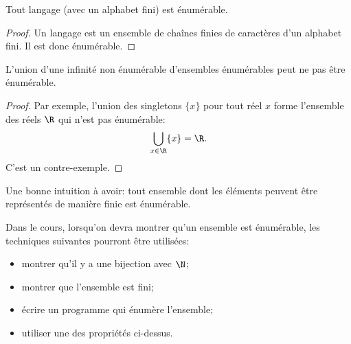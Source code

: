\begin{myprop}
 Tout langage (avec un alphabet fini) est énumérable.
 \begin{proof}
 Un langage est un ensemble de chaînes finies de caractères d'un alphabet fini. Il est donc énumérable.
 \end{proof}
\end{myprop}

\begin{myprop}
L'union d'une infinité non énumérable d'ensembles énumérables peut ne pas être énumérable.
\end{myprop}
\begin{proof}
Par exemple, l'union des singletons $\{x\}$ pour tout réel $x$ forme l'ensemble des réels $\R$ qui n'est pas énumérable:
\[ \bigcup_{x \in \R} \{x\} = \R. \]
C'est un contre-exemple.
\end{proof}

\begin{myrem}
  Une bonne intuition à avoir:
  tout ensemble dont les éléments peuvent être représentés de manière finie est énumérable.
\end{myrem}

Dans le cours, lorsqu'on devra montrer qu'un ensemble est énumérable,
les techniques suivantes pourront être utilisées:
\begin{itemize}
	\item montrer qu'il y a une bijection avec $\N$;
	\item montrer que l'ensemble est fini;
	\item écrire un programme qui énumère l'ensemble;
	\item utiliser une des propriétés ci-dessus.
\end{itemize}


